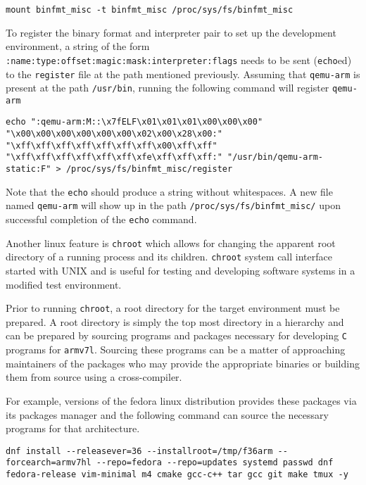 \begin{verbatim}
mount binfmt_misc -t binfmt_misc /proc/sys/fs/binfmt_misc
\end{verbatim}

To register the binary format and interpreter pair to set up the development environment, a string of the form \texttt{:name:type:offset:magic:mask:interpreter:flags} needs to be sent (\texttt{echo}ed) to the \texttt{register} file at the path mentioned previously. Assuming that \texttt{qemu-arm} is present at the path \texttt{/usr/bin}, running the following command will register \texttt{qemu-arm}

\begin{verbatim}
echo ":qemu-arm:M::\x7fELF\x01\x01\x01\x00\x00\x00" "\x00\x00\x00\x00\x00\x00\x02\x00\x28\x00:" "\xff\xff\xff\xff\xff\xff\xff\x00\xff\xff" "\xff\xff\xff\xff\xff\xff\xfe\xff\xff\xff:" "/usr/bin/qemu-arm-static:F" > /proc/sys/fs/binfmt_misc/register
\end{verbatim}

Note that the \texttt{echo} should produce a string without whitespaces. A new file named \texttt{qemu-arm} will show up in the path \texttt{/proc/sys/fs/binfmt\_misc/} upon successful completion of the \texttt{echo} command.

Another linux feature is \texttt{chroot} which allows for changing the apparent root directory of a running process and its children. \texttt{chroot} system call interface started with UNIX and is useful for testing and developing software systems in a modified test environment.

Prior to running \texttt{chroot}, a root directory for the target environment must be prepared. A root directory is simply the top most directory in a hierarchy and can be prepared by sourcing programs and packages necessary for developing \texttt{C} programs for \texttt{armv7l}. Sourcing these programs can be a matter of approaching maintainers of the packages who may provide the appropriate binaries or building them from source using a cross-compiler.

For example, versions of the fedora linux distribution provides these packages via its packages manager and the following command can source the necessary programs for that architecture.

\begin{verbatim}
dnf install --releasever=36 --installroot=/tmp/f36arm --forcearch=armv7hl --repo=fedora --repo=updates systemd passwd dnf fedora-release vim-minimal m4 cmake gcc-c++ tar gcc git make tmux -y
\end{verbatim}

